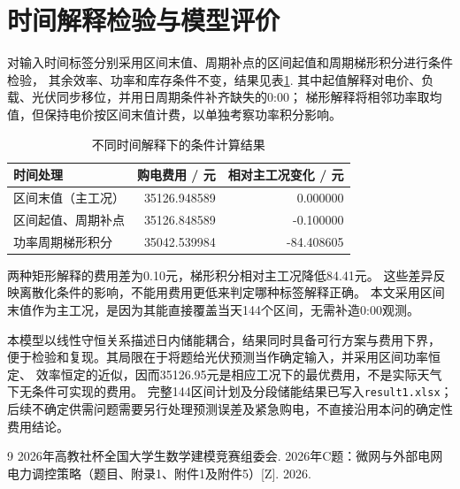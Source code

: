 \documentclass[UTF8,a4paper,12pt,fontset=fandol]{ctexart}
\begin{document}
\section{时间解释检验与模型评价}
对输入时间标签分别采用区间末值、周期补点的区间起值和周期梯形积分进行条件检验，
其余效率、功率和库存条件不变，结果见表\ref{tab:time}.
其中起值解释对电价、负载、光伏同步移位，并用日周期条件补齐缺失的0:00；
梯形解释将相邻功率取均值，但保持电价按区间末值计费，以单独考察功率积分影响。

\begin{table}[htbp]
  \centering\small
  \caption{不同时间解释下的条件计算结果}\label{tab:time}
  \begin{tabular}{lrr}
    \toprule
    时间处理 & 购电费用 / 元 & 相对主工况变化 / 元\\
    \midrule
    区间末值（主工况） & 35126.948589 & 0.000000\\
    区间起值、周期补点 & 35126.848589 & -0.100000\\
    功率周期梯形积分 & 35042.539984 & -84.408605\\
    \bottomrule
  \end{tabular}
\end{table}

两种矩形解释的费用差为0.10元，梯形积分相对主工况降低84.41元。
这些差异反映离散化条件的影响，不能用费用更低来判定哪种标签解释正确。
本文采用区间末值作为主工况，是因为其能直接覆盖当天144个区间，无需补造0:00观测。

本模型以线性守恒关系描述日内储能耦合，结果同时具备可行方案与费用下界，
便于检验和复现。其局限在于将题给光伏预测当作确定输入，并采用区间功率恒定、
效率恒定的近似，因而35126.95元是相应工况下的最优费用，不是实际天气下无条件可实现的费用。
完整144区间计划及分段储能结果已写入\texttt{result1.xlsx}；
后续不确定供需问题需要另行处理预测误差及紧急购电，不直接沿用本问的确定性费用结论。

\begin{thebibliography}{9}
2026年高教社杯全国大学生数学建模竞赛组委会.
2026年C题：微网与外部电网电力调控策略（题目、附录1、附件1及附件5）[Z].
2026.
\end{thebibliography}
\end{document}
